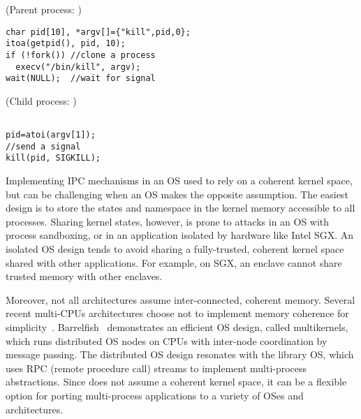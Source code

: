  

\begin{figure*}
\begin{minipage}[t]{.65\textwidth}
(Parent process: )
\lstset{basicstyle=\ttfamily\footnotesize,fontadjust=true,breaklines=true}
\begin{lstlisting}
char pid[10], *argv[]={"kill",pid,0};
itoa(getpid(), pid, 10);
if (!fork()) //clone a process
  execv("/bin/kill", argv);
wait(NULL);  //wait for signal
\end{lstlisting}
\end{minipage}
\begin{minipage}[t]{.33\textwidth}
(Child process: )
\lstset{basicstyle=\ttfamily\footnotesize,fontadjust=true,breaklines=true}
\begin{lstlisting}

pid=atoi(argv[1]);
//send a signal
kill(pid, SIGKILL);

\end{lstlisting}
\end{minipage}
\caption{Sample code for Linux applications using process cloning and inter-process communication (IPC).}
\label{fig:overview:proc-example}
\end{figure*}



Implementing IPC mechanisms in an OS used to rely on a coherent kernel space, but can be challenging when an OS makes the opposite assumption.
The easiest design is to store the states and namespace in the kernel memory accessible to all processes.
Sharing kernel states, however, is prone to attacks in an OS with process sandboxing,
or in an application
isolated by hardware like Intel SGX.
An isolated OS design tends to avoid sharing a fully-trusted, coherent kernel space shared with other applications.
For example, on SGX, an enclave cannot share trusted memory with other enclaves.


Moreover, not all architectures assume inter-connected, coherent memory.
Several recent multi-CPUs architectures choose not to implement memory coherence for simplicity~\cite{gschwind2007,cascaval2002evaluation}.
Barrelfish~\cite{baumann09barrelfish} demonstrates an efficient OS design, called multikernels, which runs distributed OS nodes on CPUs with inter-node coordination by message passing.
The distributed OS design resonates with the \graphene{} library OS, which uses RPC (remote procedure call) streams to implement multi-process abstractions.
Since \graphene{} does not assume a coherent kernel space, it can be a flexible option
for porting multi-process applications to a variety of OSes and architectures.



